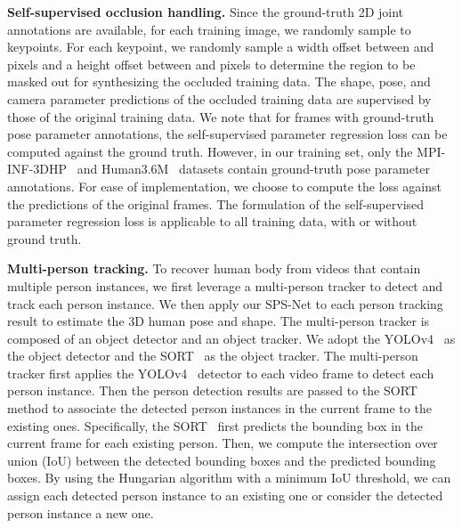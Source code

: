\documentclass[times,referee,twocolumn,final,authoryear]{elsarticle}
\newcommand{\heading}[1]{\noindent\textbf{#1}}
\begin{document}
\heading{Self-supervised occlusion handling.} 
Since the ground-truth 2D joint annotations are available, for each training image, we randomly sample  to  keypoints.
For each keypoint, we randomly sample a width offset between  and  pixels and a height offset between  and  pixels to determine the region to be masked out for synthesizing the occluded training data.
The shape, pose, and camera parameter predictions of the occluded training data are supervised by those of the original training data.
We note that for frames with ground-truth pose parameter annotations, the self-supervised parameter regression loss  can be computed against the ground truth.
However, in our training set, only the MPI-INF-3DHP~\citep{MPII} and Human3.6M~\citep{human36m} datasets contain ground-truth pose parameter annotations.
For ease of implementation, we choose to compute the loss against the predictions of the original frames.
The formulation of the self-supervised parameter regression loss  is applicable to all training data, with or without ground truth.

\heading{Multi-person tracking.} 
To recover human body from videos that contain multiple person instances, we first leverage a multi-person tracker to detect and track each person instance.
We then apply our SPS-Net to each person tracking result to estimate the 3D human pose and shape.
The multi-person tracker is composed of an object detector and an object tracker.
We adopt the YOLOv4~\citep{bochkovskiy2020yolov4} as the object detector and the SORT~\citep{bewley2016simple} as the object tracker.
The multi-person tracker first applies the YOLOv4~\citep{bochkovskiy2020yolov4} detector to each video frame to detect each person instance.
Then the person detection results are passed to the SORT~\citep{bewley2016simple} method to associate the detected person instances in the current frame to the existing ones.
Specifically, the SORT~\citep{bewley2016simple} first predicts the bounding box in the current frame for each existing person.
Then, we compute the intersection over union (IoU) between the detected bounding boxes and the predicted bounding boxes.
By using the Hungarian algorithm with a minimum IoU threshold, we can assign each detected person instance to an existing one or consider the detected person instance a new one.
\end{document}
